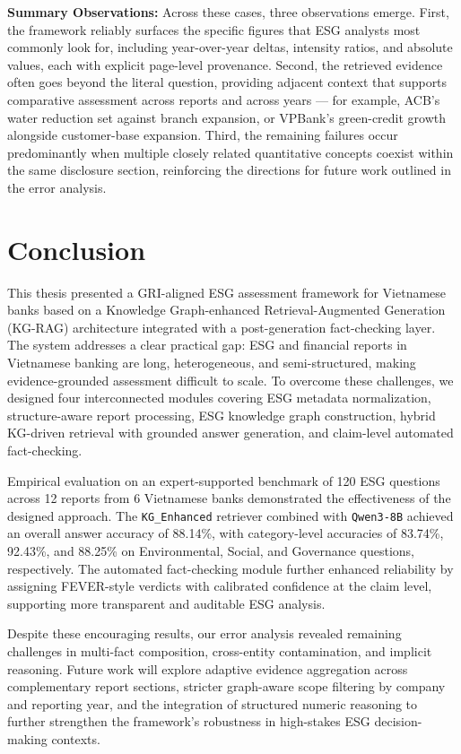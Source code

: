 \documentclass[sn-mathphys, oneside]{sn-jnl}
\begin{document}
\textbf{Summary Observations: }Across these cases, three observations emerge. First, the framework
reliably surfaces the specific figures that ESG analysts most commonly
look for, including year-over-year deltas, intensity ratios, and absolute
values, each with explicit page-level provenance. Second, the retrieved
evidence often goes beyond the literal question, providing adjacent
context that supports comparative assessment across reports and across
years --- for example, ACB's water reduction set against branch expansion,
or VPBank's green-credit growth alongside customer-base expansion. Third,
the remaining failures occur predominantly when multiple closely related
quantitative concepts coexist within the same disclosure section,
reinforcing the directions for future work outlined in the error
analysis.
 


\section{Conclusion}
\label{sec:conclusion}

This thesis presented a GRI-aligned ESG assessment framework for Vietnamese banks 
based on a Knowledge Graph-enhanced Retrieval-Augmented Generation (KG-RAG) 
architecture integrated with a post-generation fact-checking layer. The system 
addresses a clear practical gap: ESG and financial reports in Vietnamese banking 
are long, heterogeneous, and semi-structured, making evidence-grounded assessment 
difficult to scale. To overcome these challenges, we designed four interconnected 
modules covering ESG metadata normalization, structure-aware report processing, 
ESG knowledge graph construction, hybrid KG-driven retrieval with grounded answer 
generation, and claim-level automated fact-checking.

Empirical evaluation on an expert-supported benchmark of 120 ESG questions across 
12 reports from 6 Vietnamese banks demonstrated the effectiveness of the designed 
approach. The \texttt{KG\_Enhanced} retriever combined with \texttt{Qwen3-8B} 
achieved an overall answer accuracy of 88.14\%, with category-level accuracies of 
83.74\%, 92.43\%, and 88.25\% on Environmental, Social, and Governance questions, 
respectively. The automated fact-checking module further enhanced reliability by assigning FEVER-style 
verdicts with calibrated confidence at the claim level, supporting more 
transparent and auditable ESG analysis.

Despite these encouraging results, our error analysis revealed remaining 
challenges in multi-fact composition, cross-entity contamination, and implicit 
reasoning. Future work will explore adaptive evidence aggregation across 
complementary report sections, stricter graph-aware scope filtering by company 
and reporting year, and the integration of structured numeric reasoning to 
further strengthen the framework's robustness in high-stakes ESG decision-making 
contexts.
\end{document}
